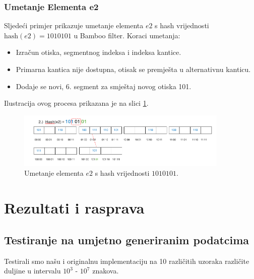 \documentclass[seminarskirad]{fer}
\begin{document}
	\subsection{Umetanje Elementa e2}
	Sljedeći primjer prikazuje umetanje elementa \( e2 \) s hash vrijednosti \( \text{hash}(e2) = 1010101 \) u Bamboo filter. Koraci umetanja:
	\begin{itemize}
		\item Izračun otiska, segmentnog indeksa i indeksa kantice.
		\item Primarna kantica nije dostupna, otisak se premješta u alternativnu kanticu.
		\item Dodaje se novi, 6. segment za smještaj novog otiska 101.
	\end{itemize}
	Ilustracija ovog procesa prikazana je na slici \ref{fig:insertion_e2}.
	
	\begin{figure}[h]
		\centering
		\includegraphics[width=0.9\textwidth]{images/umetanje_el2.png}
		\caption{Umetanje elementa \( e2 \) s hash vrijednosti \( 1010101 \).}
		\label{fig:insertion_e2}
	\end{figure}
	

\chapter{Rezultati i rasprava}
\label{pog:rezultati_i_rasprava}

\section{Testiranje na umjetno generiranim podatcima}
Testirali smo našu i originalnu implementaciju na 10 različitih uzoraka različite duljine u intervalu \(10^3\) - \(10^7\) znakova. \\
\end{document}
